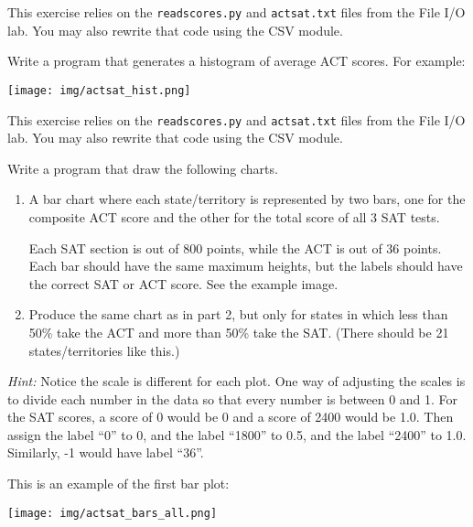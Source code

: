 \documentclass[11pt]{cselabheader}
\begin{document}
\begin{ex}[scorehist.py]
  This exercise relies on the \texttt{readscores.py} and
\texttt{actsat.txt} files from the File I/O lab. You may also rewrite
that code using the CSV module.

  Write a program that generates a histogram of average ACT scores.
  For example:

  \begin{center}
  \texttt{[image: img/actsat\_hist.png]}
  \end{center}
\end{ex}

\begin{ex}[scorebar.py]
  This exercise relies on the \texttt{readscores.py} and
\texttt{actsat.txt} files from the File I/O lab. You may also rewrite
that code using the CSV module.

  Write a program that draw the following charts.
  \begin{enumerate}
    \item A bar chart where each state/territory is represented by two
      bars, one for the composite ACT score and the other for the total
      score of all 3 SAT tests.

      Each SAT section is out of 800 points, while the ACT is out of
      36 points. Each bar should have the same maximum heights, but the
      labels should have the correct SAT or ACT score. See the example
      image.
    \item Produce the same chart as in part 2, but only for states in which
      less than 50\% take the ACT and more than 50\% take the SAT. (There
      should be 21 states/territories like this.)
  \end{enumerate}

  \textsl{Hint:} Notice the scale is different for each plot. One way of 
    adjusting the scales is to divide each number in the data so that
    every number is between 0 and 1. For the SAT scores, a score of 0 would be 0
    and a score of 2400 would be 1.0. Then assign the label ``0'' to 0, and
    the label ``1800'' to 0.5, and the label ``2400'' to 1.0.
    Similarly, -1 would have label ``36''.
    
    This is an example of the first bar plot:
  \begin{center}
  \texttt{[image: img/actsat\_bars\_all.png]}
  \end{center}
\end{ex}
\end{document}
